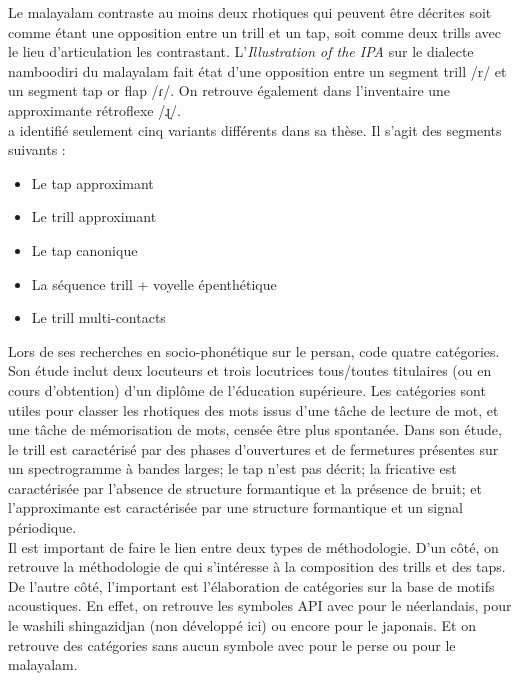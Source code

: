 Le malayalam contraste au moins deux rhotiques qui peuvent être décrites soit comme étant une opposition entre un trill et un tap, soit comme deux trills avec le lieu d'articulation les contrastant. L'\textit{Illustration of the IPA} \cite{namboodiripadMalayalamNamboodiriDialect2017a} sur le dialecte namboodiri du malayalam fait état d'une opposition entre un segment trill /r/ et un segment tap or flap /ɾ/. On retrouve également dans l'inventaire une approximante rétroflexe /ɻ/.\\

\citeauthor{punnooseAuditoryAcousticStudy2010} a identifié seulement cinq variants différents dans sa thèse. Il s'agit des segments suivants :

\begin{itemize}
	\item Le tap approximant
	\item Le trill approximant
	\item Le tap canonique
	\item La séquence trill + voyelle épenthétique
	\item Le trill multi-contacts
\end{itemize}

Lors de ses recherches en socio-phonétique sur le persan, \textcite{rafatSocioPhoneticInvestigationRhotics2010} code quatre catégories. Son étude inclut deux locuteurs et trois locutrices tous/toutes titulaires (ou en cours d'obtention) d'un diplôme de l'éducation supérieure. Les catégories sont utiles pour classer les rhotiques des mots issus d'une tâche de lecture de mot, et une tâche de mémorisation de mots, censée être plus spontanée. Dans son étude, le trill est caractérisé par des phases d'ouvertures et de fermetures présentes sur un spectrogramme à bandes larges; le tap n'est pas décrit; la fricative est caractérisée par l'absence de structure formantique et la présence de bruit; et l'approximante est caractérisée par une structure formantique et un signal périodique.\\


Il est important de faire le lien entre deux types de méthodologie. D'un côté, on retrouve la méthodologie de \textcite{blecuaVibrantesEspanolManifestaciones2002} qui s'intéresse à la composition des trills et des taps. De l'autre côté, l'important est l'élaboration de catégories sur la base de motifs acoustiques. En effet, on retrouve les symboles API avec \textcite{sebregtsSociophoneticsPhonologyDutch2014} pour le néerlandais, \textcite{patinWashiliShingazidja2013} pour le washili shingazidjan (non développé ici) ou encore \textcite{magnusonWhatSoundsKansai2008} pour le japonais. Et on retrouve des catégories sans aucun symbole avec \textcite{rafatSocioPhoneticInvestigationRhotics2010} pour le perse ou \citeauthor{punnooseAuditoryAcousticStudy2010} pour le malayalam.\\


